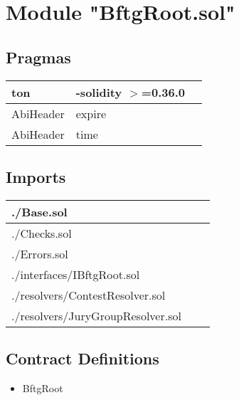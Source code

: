 
\section{Module "BftgRoot.sol"}


\subsection{Pragmas}


\noindent\begin{tabular}{|l|l|p{5cm}|}\hline
ton & -solidity $>$=0.36.0 &\\\hline
AbiHeader &  expire &\\\hline
AbiHeader &  time &\\\hline
\end{tabular}


\subsection{Imports}


\noindent\begin{tabular}{|l|l|p{5cm}|}\hline
./Base.sol &\\\hline
./Checks.sol &\\\hline
./Errors.sol &\\\hline
./interfaces/IBftgRoot.sol &\\\hline
./resolvers/ContestResolver.sol &\\\hline
./resolvers/JuryGroupResolver.sol &\\\hline
\end{tabular}


\subsection{Contract Definitions}

\begin{itemize}
\item BftgRoot
\end{itemize}
